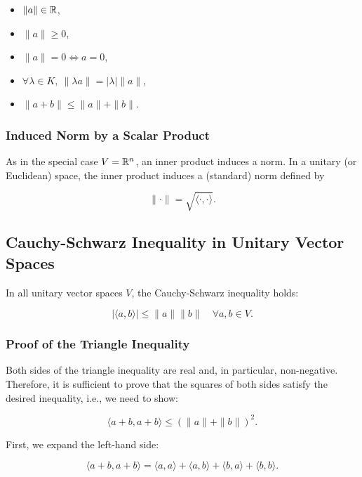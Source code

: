 \begin{itemize}

    \item \( \|a\| \in \mathbb{R} \),

    \item \( \|a\| \geq 0 \),

    \item \( \|a\| = 0 \iff a = 0 \),

    \item \( \forall \lambda \in K, \ \| \lambda a \| = |\lambda| \| a \| \),

    \item \( \| a + b \| \leq \| a \| + \| b \| \).

\end{itemize}

\subsubsection{Induced Norm by a Scalar Product}

As in the special case \( V = \mathbb{R}^n \), an inner product induces a norm.
In a unitary (or Euclidean) space, the inner product induces a (standard) norm defined by

\[
    \| \cdot \| = \sqrt{\langle \cdot, \cdot \rangle}.
\]

\subsection{Cauchy-Schwarz Inequality in Unitary Vector Spaces}

In all unitary vector spaces \( V \), the Cauchy-Schwarz inequality holds:

\[
    | \langle a, b \rangle | \leq \| a \| \| b \| \quad \forall a, b \in V.
\]

\subsubsection{Proof of the Triangle Inequality}

Both sides of the triangle inequality are real and, in particular, non-negative. 
Therefore, it is sufficient to prove that the squares of both sides satisfy the 
desired inequality, i.e., we need to show:

\[
    \langle a + b, a + b \rangle \leq {(\|a\| + \|b\|)}^2.
\]

First, we expand the left-hand side:

\[
    \langle a + b, a + b \rangle = \langle a, a \rangle + \langle a, b \rangle + \langle b, a \rangle + 
    \langle b, b \rangle.
\]

